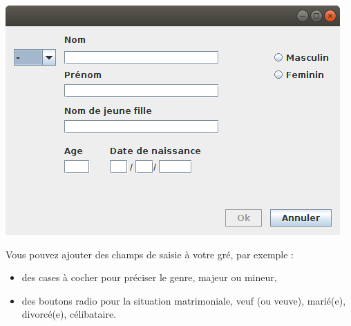 \documentclass[12pt,a4paper]{article}
\begin{document}
 

\medskip

\includegraphics{images/dialogue.png}


\medskip

Vous pouvez ajouter des champs de saisie à votre gré, par exemple :
 \medskip

\begin{itemize}
\item des cases à cocher pour préciser le genre, majeur ou mineur,
\item des boutons \og radio \fg{} pour la situation matrimoniale, veuf (ou veuve), marié(e), divorcé(e), célibataire.
\end{itemize}
\end{document}
